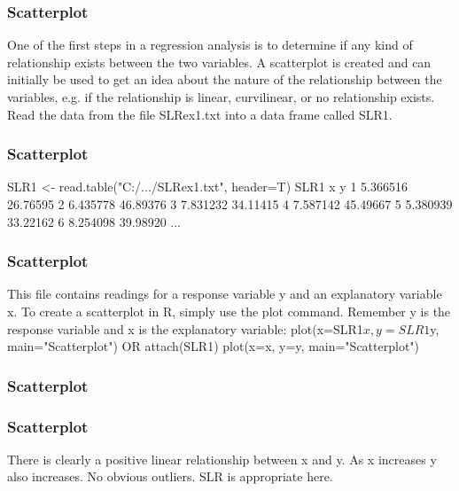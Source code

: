 \begin{frame}[fragile]
\frametitle{Scatterplot}
One of the first steps in a regression analysis is to determine if any
kind of relationship exists between the two variables.
A scatterplot is created and can initially be used to get an idea
about the nature of the relationship between the variables, e.g. if
the relationship is linear, curvilinear, or no relationship exists.
Read the data from the file SLRex1.txt into a data frame called
SLR1.
\end{frame}
\begin{frame}[fragile]
\frametitle{Scatterplot}
SLR1 <- read.table("C:/.../SLRex1.txt", header=T)
SLR1
x y
1 5.366516 26.76595
2 6.435778 46.89376
3 7.831232 34.11415
4 7.587142 45.49667
5 5.380939 33.22162
6 8.254098 39.98920
...

\end{frame}
\begin{frame}[fragile]
\frametitle{Scatterplot}
This file contains readings for a response variable y and an
explanatory variable x.
To create a scatterplot in R, simply use the plot command.
Remember y is the response variable and x is the explanatory
variable:
plot(x=SLR1$x, y=SLR1$y, main="Scatterplot")
OR
attach(SLR1)
plot(x=x, y=y, main="Scatterplot")
\end{frame}
\begin{frame}[fragile]
\frametitle{Scatterplot}
\end{frame}
\begin{frame}[fragile]
\frametitle{Scatterplot}
There is clearly a positive linear relationship between x and y. As x
increases y also increases. No obvious outliers. SLR is appropriate
here.
\end{frame}

